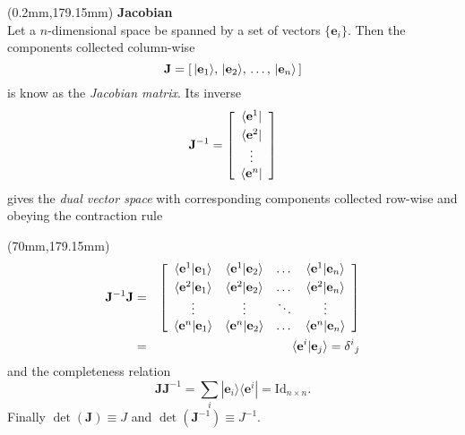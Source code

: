 \TPshowboxesfalse
\begin{textblock*}{70mm}(0.2mm,179.15mm)
{\centering \bf Jacobian}\\
  Let a $n$-dimensional space be spanned by a
  set of vectors $\{{\mathbf e}_i \}$.
  Then the components collected column-wise
    \[
      {\mathbf J} = \left[\, |{\mathbf e}_1 \rangle, \, | {\mathbf e}_2 \rangle, \,  \dots , \, | {\mathbf e}_n \rangle \, \vspace{10mm} \right]
    \]
  is know as the \emph{Jacobian matrix}.  Its inverse
    \[
      {\mathbf J}^{-1} = \left[ \begin{array}{c} \langle {\mathbf e}^1 | \vspace{1mm}\\ \langle {\mathbf e}^2 | \\ \vdots \\ \langle {\mathbf e}^n | \end{array} \right]
    \]
    gives the \emph{dual vector space} with corresponding components collected row-wise and obeying the contraction rule
\end{textblock*}

\TPshowboxesfalse
\begin{textblock*}{70mm}(70mm,179.15mm)
\begin{eqnarray*}
  {\mathbf J}^{-1} {\mathbf J} & = &  \left[ \begin{array}{cccc}
                 \langle {\mathbf e}^1 | {\mathbf e}_1 \rangle & \langle {\mathbf e}^1 | {\mathbf e}_2 \rangle & \dots & \langle {\mathbf e}^1 | {\mathbf e}_n \rangle \vspace{1mm}\\
                 \langle {\mathbf e}^2 | {\mathbf e}_1 \rangle & \langle {\mathbf e}^2 | {\mathbf e}_2 \rangle & \dots & \langle {\mathbf e}^2 | {\mathbf e}_n \rangle \\
	    	     \vdots                   &     \vdots                 & \ddots &   \vdots \\
                 \langle {\mathbf e}^n | {\mathbf e}_1 \rangle & \langle {\mathbf e}^n | {\mathbf e}_2 \rangle & \dots & \langle {\mathbf e}^n | {\mathbf e}_n \rangle \\
			   \end{array} \right] \\
		   & = & \langle {\mathbf e}^i | {\mathbf e}_j \rangle = {\delta^i}_j
\end{eqnarray*}
and the completeness relation
\[
  {\mathbf J} {\mathbf J}^{-1} = \sum_i | {\mathbf e}_i \rangle \langle {\mathbf e}^i | = \mbox{Id}_{n \times n} .
\]
Finally $\det( {\mathbf J} ) \equiv J$ and $\det( {\mathbf J}^{-1}) \equiv J^{-1}$.
\end{textblock*}


